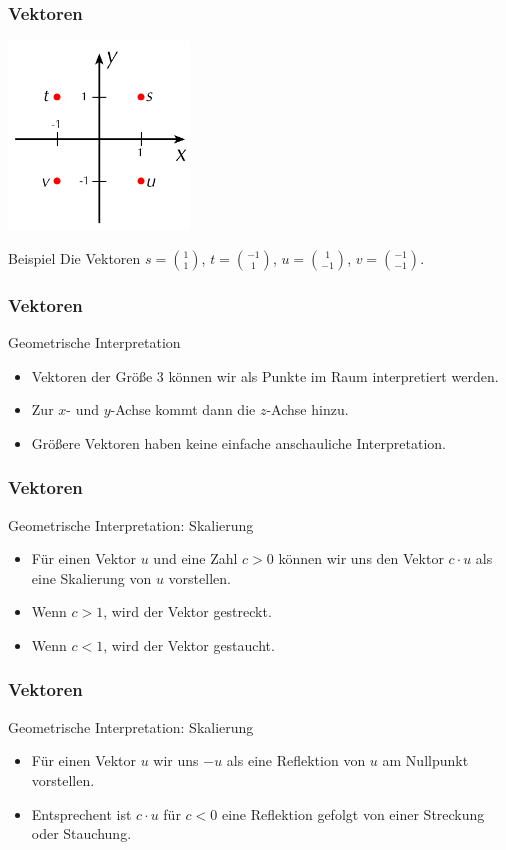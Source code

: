 \documentclass{beamer}
\renewcommand{\oe}{\"o}
\newcommand{\ue}{\"u}
\newcommand{\mytitle}{Vektoren}
\begin{document}
\begin{frame}\frametitle{\mytitle}
	\hfill\includegraphics[height=50mm]{pics/vectors.pdf}
	\begin{block}{Beispiel}
		Die Vektoren $s=\binom11$, $t=\binom{-1}1$, $u=\binom1{-1}$, $v=\binom{-1}{-1}$.
	\end{block}
\end{frame}

\begin{frame}\frametitle{\mytitle}
	\begin{block}{Geometrische Interpretation}
	\begin{itemize}
		\item Vektoren der Gr\oe\ss e 3 k\oe nnen wir als Punkte im Raum interpretiert werden.
		\item Zur $x$- und $y$-Achse kommt dann die $z$-Achse hinzu.
		\item Gr\oe\ss ere Vektoren haben keine einfache anschauliche Interpretation.
	\end{itemize}
	\end{block}
\end{frame}

\begin{frame}\frametitle{\mytitle}
	\begin{block}{Geometrische Interpretation: Skalierung}
	\begin{itemize}
		\item F\ue r einen Vektor $u$ und eine Zahl $c>0$ k\oe nnen wir uns den Vektor $c\cdot u$ als eine Skalierung von $u$ vorstellen.
		\item Wenn $c>1$, wird der Vektor gestreckt.
		\item Wenn $c<1$, wird der Vektor gestaucht.
	\end{itemize}
	\end{block}
\end{frame}

\begin{frame}\frametitle{\mytitle}
	\begin{block}{Geometrische Interpretation: Skalierung}
	\begin{itemize}
		\item F\ue r einen Vektor $u$ wir uns $-u$ als eine Reflektion von $u$ am Nullpunkt vorstellen.
		\item Entsprechent ist $c\cdot u$ f\ue r $c<0$ eine Reflektion gefolgt von einer Streckung oder Stauchung.
	\end{itemize}
	\end{block}
\end{frame}
\end{document}
